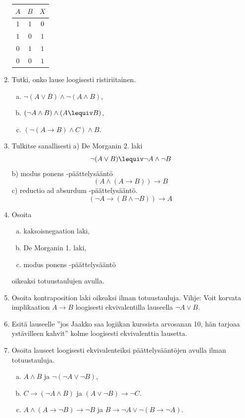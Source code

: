 \begin{enumerate}
\begin{center}
\begin{tabular}{|c|c|c|}\hline
$A$ & $B$ & $X$\\ \hline
$1$ & $1$ & $0$\\
$1$ & $0$ & $1$\\
$0$ & $1$ & $1$\\
$0$ & $0$ & $1$\\ \hline
\end{tabular}
\end{center}

\item Tutki, onko lause loogisesti ristiriitainen.
\begin{enumerate}[a)]
\item $\lnot (A \lor B) \land \lnot (A\land B)$,
\item $(\lnot A \land B) \land (A \lequiv B)$,
\item $(\lnot (A \to B) \land C) \land B$.
\end{enumerate}

\item Tulkitse sanallisesti a)
De Morganin 2. laki
\[
\lnot (A\lor B) \lequiv \lnot A\land \lnot B
\]
b)
modus ponens -päättelysääntö
\[
(A \land (A\to B))\to B
\]
c)
reductio ad absurdum -päättelysääntö.
\[
(\lnot A \to (B\land \lnot B))\to A
\]

\item Osoita
\begin{enumerate}[a)]
\item kaksoisnegaation laki,
\item De Morganin 1. laki,
\item modus ponens -päättelysääntö
\end{enumerate}
oikeaksi totuustaulujen avulla.

\item Osoita kontraposition laki oikeaksi ilman
totuustauluja.
Vihje: Voit korvata implikaation $A\to B$ loogisesti
ekvivalentilla lauseella $\lnot A \lor B$.

\item Esitä lauseelle ''jos Jaakko saa logiikan kurssista
arvosanan 10, hän tarjoaa ystävilleen kahvit'' kolme
loogisesti ekvivalenttia lausetta.

\item Osoita lauseet loogisesti ekvivalenteiksi
päättelysääntöjen avulla ilman totuustauluja.
\begin{enumerate}[a)]
\item $A\land B$ ja $\lnot(\lnot A \lor \lnot B)$,
\item $C\to (\lnot A \land B)$ ja $(A\lor \lnot B)\to
\lnot C$.
\item $A \land (A\to \lnot B)\to \lnot B$ ja $B\to
\lnot A\lor \lnot (B\to \lnot A)$.
\end{enumerate}


\end{enumerate}
